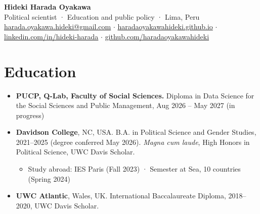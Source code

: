\documentclass[10pt,a4paper]{article}
\newcommand{\serif}{\fontfamily{IBMPlexSerif-TLF}\selectfont}
\begin{document}
{\serif\Huge\bfseries\color{navy} Hideki Harada Oyakawa}\\[2pt]
{\small\color{gray} Political scientist · Education and public policy · Lima, Peru}\\
{\small \href{mailto:harada.oyakawa.hideki@gmail.com}{harada.oyakawa.hideki@gmail.com} $\cdot$ \href{https://haradaoyakawahideki.github.io}{haradaoyakawahideki.github.io} $\cdot$ \href{https://www.linkedin.com/in/hideki-harada}{linkedin.com/in/hideki-harada} $\cdot$ \href{https://github.com/haradaoyakawahideki}{github.com/haradaoyakawahideki}}
\section*{Education}
\begin{itemize}
\item \textbf{PUCP, Q-Lab, Faculty of Social Sciences.} Diploma in Data Science for the Social Sciences and Public Management, Aug 2026 – May 2027 (in progress)
\item \textbf{Davidson College}, NC, USA. B.A. in Political Science and Gender Studies, 2021–2025 (degree conferred May 2026). \textit{Magna cum laude}, High Honors in Political Science, UWC Davis Scholar.
\begin{itemize}
\item Study abroad: IES Paris (Fall 2023) · Semester at Sea, 10 countries (Spring 2024)
\end{itemize}
\item \textbf{UWC Atlantic}, Wales, UK. International Baccalaureate Diploma, 2018–2020, UWC Davis Scholar.
\end{itemize}
\end{document}

